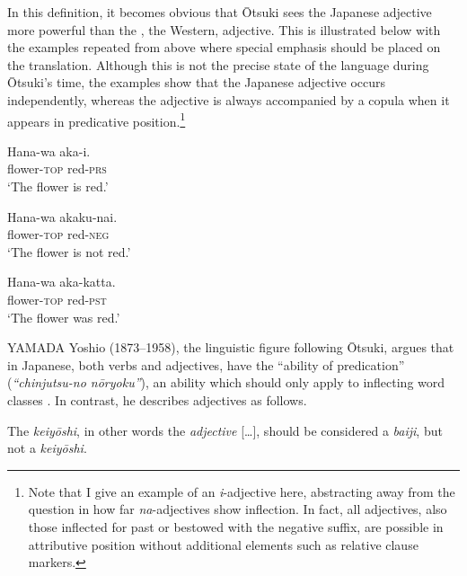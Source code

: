 \documentclass[output=paper,colorlinks,citecolor=brown]{langscibook}
\begin{document}
In this definition, it becomes obvious that Ōtsuki sees the Japanese adjective more powerful than the , the Western, adjective. This is illustrated below with the examples repeated from above where special emphasis should be placed on the  translation. Although this is not the precise state of the language during Ōtsuki's time, the examples show that the Japanese adjective occurs independently, whereas the  adjective is always accompanied by a copula when it appears in predicative position.\footnote{Note that I give an example of an \emph{i}-adjective here, abstracting away from the question in how far \emph{na}-adjectives show inflection. In fact, all adjectives, also those inflected for past or bestowed with the negative suffix, are possible in attributive position without additional elements such as relative clause markers.}

\begin{exe}
	\ex \label{12ex37}
	\begin{xlist}
		\ex 
		\gll Hana-wa aka-i. \\
		flower-\textsc{top} red-\textsc{prs} \\
		\trans ‘The flower is red.’
		
		\ex 
		\gll Hana-wa akaku-nai. \\
		flower-\textsc{top} red-\textsc{neg} \\
		\trans ‘The flower is not red.’
		
		\ex 
		\gll Hana-wa aka-katta. \\
		flower-\textsc{top} red-\textsc{pst} \\
		\trans ‘The flower was red.’
	\end{xlist}
\end{exe}

{\sloppy YAMADA Yoshio (1873--1958), the linguistic figure following Ōtsuki, argues that in Japanese, both verbs and adjectives, have the ``ability of predication'' (\emph{``chinjutsu-no nōryoku''}), an ability which should only apply to inflecting word classes \citep[861]{yamada1908}. In contrast, he describes  adjectives as follows.\par}

\begin{exe}
	\ex \label{12ex38}
	The  \emph{keiyōshi}, in other words the \emph{adjective} […], should be considered a \emph{baiji}, but not a \emph{keiyōshi}. 
	
	\hfill \citep[869]{yamada1908}
\end{exe}
\end{document}
